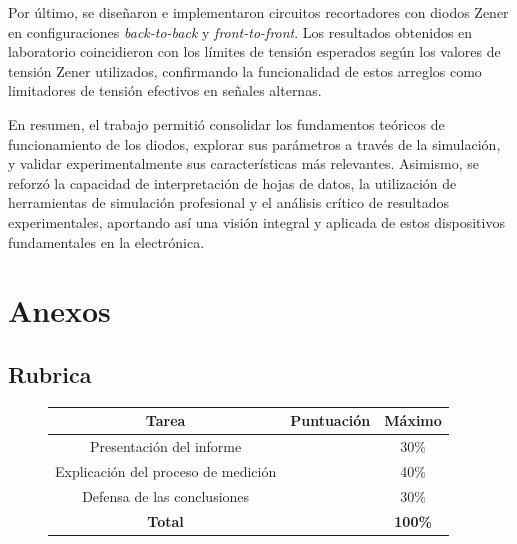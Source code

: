 \documentclass[chaptersright]{informeutn}
\begin{document}
Por último, se diseñaron e implementaron circuitos recortadores con diodos Zener en configuraciones \textit{back-to-back} y \textit{front-to-front}. Los resultados obtenidos en laboratorio coincidieron con los límites de tensión esperados según los valores de tensión Zener utilizados, confirmando la funcionalidad de estos arreglos como limitadores de tensión efectivos en señales alternas.

En resumen, el trabajo permitió consolidar los fundamentos teóricos de funcionamiento de los diodos, explorar sus parámetros a través de la simulación, y validar experimentalmente sus características más relevantes. Asimismo, se reforzó la capacidad de interpretación de hojas de datos, la utilización de herramientas de simulación profesional y el análisis crítico de resultados experimentales, aportando así una visión integral y aplicada de estos dispositivos fundamentales en la electrónica.
  

    \chapter{Anexos}
      \section{Rubrica}
      \begin{figure}[!h]
        \centering
        \begin{tabular}[c]{|c|c|c|}
          \rowcolor{gray!30}
          \hline
          \textbf{Tarea}                      & \textbf{Puntuación} & \textbf{Máximo}\\
          \hline
          Presentación del informe            &                     & 30\%\\
          \hline
          Explicación del proceso de medición &                     & 40\%\\
          \hline
          Defensa de las conclusiones         &                     & 30\%\\
          \hline
          \textbf{Total}                      &                     & \textbf{100\%}\\
          \hline
        \end{tabular}
      \end{figure}
\end{document}
